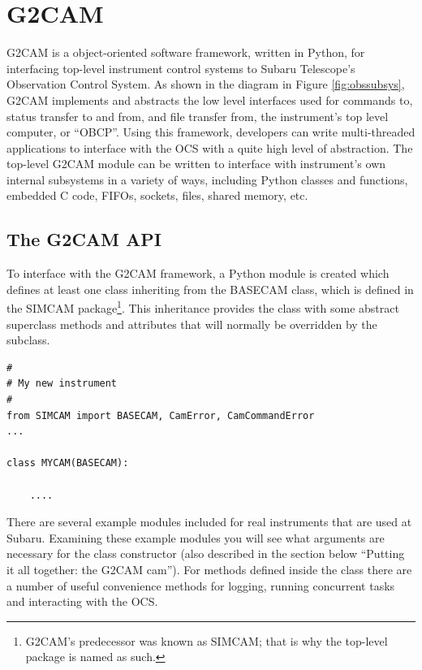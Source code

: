 \documentclass[11pt]{report}
\begin{document}
\chapter{G2CAM}
G2CAM is a object-oriented software framework, written in Python, for
interfacing top-level instrument control systems to Subaru Telescope's
Observation Control System. As shown in the diagram in Figure
\ref{fig:obssubsys}, G2CAM implements and abstracts the low level
interfaces used for commands to, status transfer to and from, and file
transfer from, the instrument's top level computer, or ``OBCP''. Using
this framework, developers can write multi-threaded applications to
interface with the OCS with a quite high level of abstraction. The
top-level G2CAM module can be written to interface with instrument's
own internal subsystems in a variety of ways, including Python classes
and functions, embedded C code, FIFOs, sockets, files, shared memory,
etc.

\section{The G2CAM API}
To interface with the G2CAM framework, a Python module is created which
defines at least one class inheriting from the BASECAM class, which is
defined in the SIMCAM package\footnote{G2CAM's predecessor was known as
SIMCAM; that is why the top-level package is named as such.}.
This inheritance provides the class with some abstract superclass
methods and attributes that will normally be overridden by the subclass. 

\begin{verbatim}
#
# My new instrument
#
from SIMCAM import BASECAM, CamError, CamCommandError
...

class MYCAM(BASECAM):

    ....

\end{verbatim}
There are several example modules included for real instruments that are
used at Subaru. Examining these example modules you will see what
arguments are necessary for the class constructor (also described in the
section below ``Putting it all together: the G2CAM cam'').
For methods defined inside the class there are a number of useful
convenience methods for logging, running concurrent tasks and
interacting with the OCS. 
\end{document}
